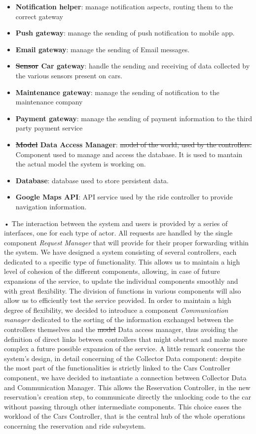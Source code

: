 \documentclass[10pt, a4paper,titlepage]{article}
\begin{document}
\begin{itemize}
\item \textbf{Notification helper}: manage notification aspects, routing them to the correct gateway
\item \textbf{Push gateway}: manage the sending of push notification to mobile app.
\item \textbf{Email gateway}: manage the sending of Email messages.
\item \textbf{\sout{Sensor} Car gateway}: handle the sending and receiving of data collected by the various sensors present on cars.
\item \textbf{Maintenance gateway}: manage the sending of notification to the maintenance company
\item \textbf{Payment gateway}: manage the sending of payment information to the third party payment service
\item \textbf{\sout{Model} Data Access Manager}: \sout{model of the world, used by the controllers.} Component used to manage and access the database. It is used to mantain the actual model the system is working on.
\item \textbf{Database}: database used to store persistent data.
\item \textbf{Google Maps API}: API service used by the ride controller to provide navigation information.
\end{itemize}•
The interaction between the system and users is provided by a series of interfaces, one for each type of actor. All requests are handled by the single component \emph{Request Manager} that will provide for their proper forwarding within the system. We have designed a system consisting of several controllers, each dedicated to a specific type of functionality. This allows us to maintain a high level of cohesion of the different components, allowing, in case of future expansions of the service, to update the individual components smoothly and with great flexibility. The division of functions in various components will also allow us to efficiently test the service provided. In order to maintain a high degree of flexibility, we decided to introduce a component \emph{Communication manager} dedicated to the sorting of the information exchanged between the controllers themselves and the \sout{model} Data access manager, thus avoiding the definition of direct links between controllers that might obstruct and make more complex a future possible expansion of the service. A little remark concerns the system’s design, in detail concerning of the Collector Data component: despite the most part of the functionalities is strictly linked to the Cars Controller component, we have decided to instantiate a connection between Collector Data and Communication Manager. This allows the Reservation Controller, in the new reservation’s creation step, to communicate directly the unlocking code to the car without passing through other intermediate components. This choice eases the workload of the Cars Controller, that is the central hub of the whole operations concerning the reservation and ride subsystem. 
\end{document}
